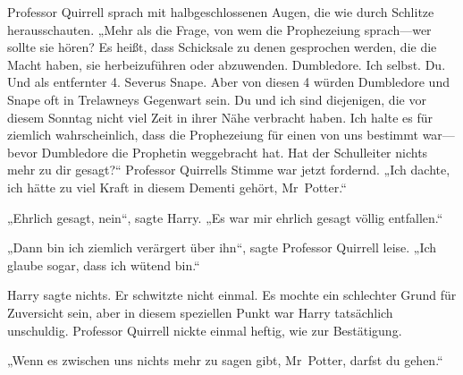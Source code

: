 Professor Quirrell sprach mit halbgeschlossenen Augen, die wie durch Schlitze herausschauten. „Mehr als die Frage, von wem die Prophezeiung sprach—wer sollte sie hören? Es heißt, dass Schicksale zu denen gesprochen werden, die die Macht haben, sie herbeizuführen oder abzuwenden. Dumbledore. Ich selbst. Du. Und als entfernter 4. Severus Snape. Aber von diesen 4 würden Dumbledore und Snape oft in Trelawneys Gegenwart sein. Du und ich sind diejenigen, die vor diesem Sonntag nicht viel Zeit in ihrer Nähe verbracht haben. Ich halte es für ziemlich wahrscheinlich, dass die Prophezeiung für einen von uns bestimmt war—bevor Dumbledore die Prophetin weggebracht hat. Hat der Schulleiter nichts mehr zu dir gesagt?“ Professor Quirrells Stimme war jetzt fordernd. „Ich dachte, ich hätte zu viel Kraft in diesem Dementi gehört, Mr~Potter.“

„Ehrlich gesagt, nein“, sagte Harry. „Es war mir ehrlich gesagt völlig entfallen.“

„Dann bin ich ziemlich verärgert über ihn“, sagte Professor Quirrell leise. „Ich glaube sogar, dass ich wütend bin.“

Harry sagte nichts. Er schwitzte nicht einmal. Es mochte ein schlechter Grund für Zuversicht sein, aber in diesem speziellen Punkt war Harry tatsächlich unschuldig. Professor Quirrell nickte einmal heftig, wie zur Bestätigung.

„Wenn es zwischen uns nichts mehr zu sagen gibt, Mr~Potter, darfst du gehen.“

